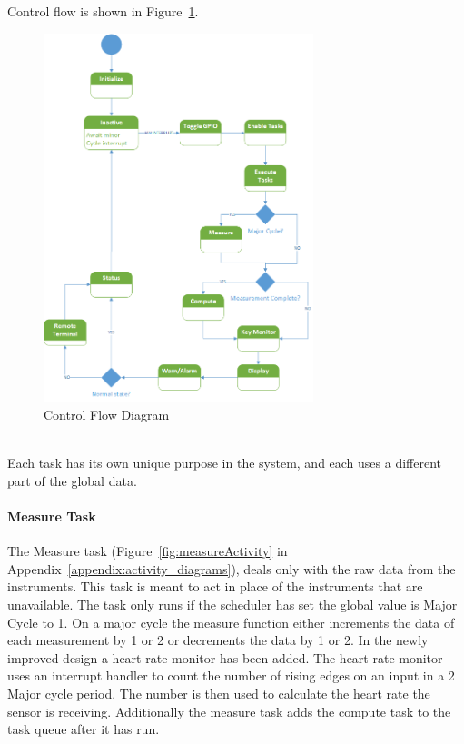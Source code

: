 \documentclass[12pt]{article} %
\begin{document}
    Control flow is shown in Figure~\ref{fig:Control}. 

    \begin{figure}[h]
      \centering
      \includegraphics[width=0.7\textwidth]{../design/Control_state_diagram.png}
      \caption{Control Flow Diagram}
      \label{fig:Control}
    \end{figure}
~\\
    Each task has its own unique purpose in the system, and each uses a different
    part of the global data.

		\paragraph{Measure Task} The Measure task (Figure~\ref{fig:measureActivity}
		in Appendix~\ref{appendix:activity_diagrams}), deals only with the raw data from the
		instruments. This task is meant to act in place of the instruments that are
		unavailable. The task only runs if the scheduler has set the global value
		is Major Cycle to 1. On a major cycle the measure function either
		increments the data of each measurement by 1 or 2 or decrements the data by
		1 or 2. In the newly improved design a heart rate monitor has been added.
		The heart rate monitor uses an interrupt handler to count the number of
		rising edges on an input in a 2 Major cycle period. The number is then used
		to calculate the heart rate the sensor is receiving. Additionally the
		measure task adds the compute task to the task queue after it has run.
\end{document}
